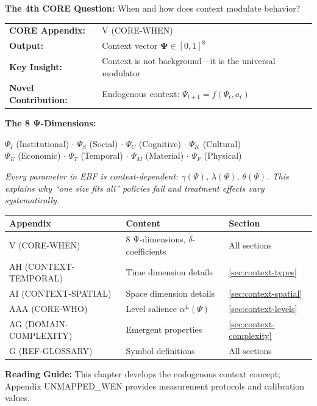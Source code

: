 \begin{tcolorbox}[
    colback=green!5!white,
    colframe=green!75!black,
    title={\textbf{10C CORE Connection: WHEN (Question 4)}},
    fonttitle=\bfseries
]
\textbf{The 4th CORE Question:} When and how does context modulate behavior?

\medskip
\begin{tabular}{ll}
\textbf{CORE Appendix:} & V (CORE-WHEN) \\
\textbf{Output:} & Context vector $\boldsymbol{\Psi} \in [0,1]^8$ \\
\textbf{Key Insight:} & Context is not background---it is the universal modulator \\
\textbf{Novel Contribution:} & Endogenous context: $\Psi_{t+1} = f(\Psi_t, a_t)$
\end{tabular}

\medskip
\textbf{The 8 Ψ-Dimensions:}
\begin{center}
\small
$\Psi_I$ (Institutional) $\cdot$ $\Psi_S$ (Social) $\cdot$ $\Psi_C$ (Cognitive) $\cdot$ $\Psi_K$ (Cultural)\\
$\Psi_E$ (Economic) $\cdot$ $\Psi_T$ (Temporal) $\cdot$ $\Psi_M$ (Material) $\cdot$ $\Psi_F$ (Physical)
\end{center}

\textit{Every parameter in EBF is context-dependent: $\gamma(\Psi)$, $\lambda(\Psi)$, $\theta(\Psi)$. This explains why ``one size fits all'' policies fail and treatment effects vary systematically.}
\end{tcolorbox}

\begin{tcolorbox}[
    colback=yellow!10!white,
    colframe=orange!75!black,
    title={\textbf{Appendix References for This Chapter}},
    fonttitle=\bfseries
]
\begin{tabular}{lll}
\textbf{Appendix} & \textbf{Content} & \textbf{Section} \\
\midrule
V (CORE-WHEN) & 8 Ψ-dimensions, $\delta$-coefficients & All sections \\
AH (CONTEXT-TEMPORAL) & Time dimension details & \ref{sec:context-types} \\
AI (CONTEXT-SPATIAL) & Space dimension details & \ref{sec:context-spatial} \\
AAA (CORE-WHO) & Level salience $\alpha^L(\Psi)$ & \ref{sec:context-levels} \\
AG (DOMAIN-COMPLEXITY) & Emergent properties & \ref{sec:context-complexity} \\
G (REF-GLOSSARY) & Symbol definitions & All sections
\end{tabular}

\medskip
\textbf{Reading Guide:} This chapter develops the endogenous context concept;
Appendix UNMAPPED_WEN provides measurement protocols and calibration values.
\end{tcolorbox}

